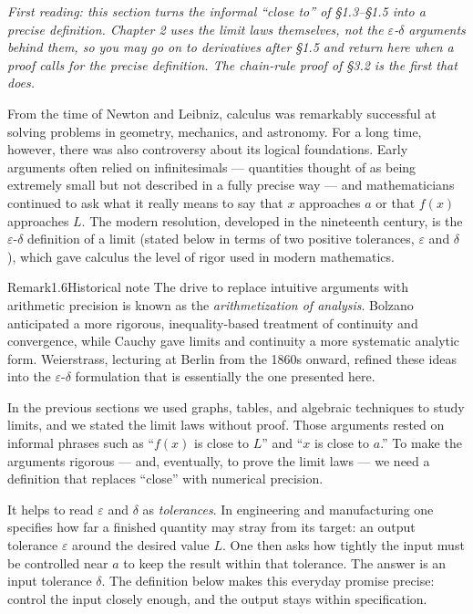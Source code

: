 \documentclass[a4paper,12pt,oneside]{memoir}
\begin{document}
\emph{First reading: this section turns the informal “close to” of §1.3–§1.5 into a precise definition. Chapter 2 uses the limit laws themselves, not the \(\varepsilon\)-\(\delta\) arguments behind them, so you may go on to derivatives after §1.5 and return here when a proof calls for the precise definition. The chain-rule proof of §3.2 is the first that does.}

From the time of Newton and Leibniz, calculus was remarkably successful at solving problems in geometry, mechanics, and astronomy. For a long time, however, there was also controversy about its logical foundations. Early arguments often relied on infinitesimals — quantities thought of as being extremely small but not described in a fully precise way — and mathematicians continued to ask what it really means to say that \(x\) approaches \(a\) or that \(f(x)\) approaches \(L\). The modern resolution, developed in the nineteenth century, is the \(\varepsilon\)-\(\delta\) definition of a limit (stated below in terms of two positive tolerances, \(\varepsilon\) and \(\delta\)), which gave calculus the level of rigor used in modern mathematics.

\begin{envremark}{Remark}{1.6}{Historical note}
The drive to replace intuitive arguments with arithmetic precision is known as the \emph{arithmetization of analysis}. Bolzano anticipated a more rigorous, inequality-based treatment of continuity and convergence, while Cauchy gave limits and continuity a more systematic analytic form. Weierstrass, lecturing at Berlin from the 1860s onward, refined these ideas into the \(\varepsilon\text{-}\delta\) formulation that is essentially the one presented here.
\end{envremark}
In the previous sections we used graphs, tables, and algebraic techniques to study limits, and we stated the limit laws without proof. Those arguments rested on informal phrases such as “\(f(x)\) is close to \(L\)” and “\(x\) is close to \(a\).” To make the arguments rigorous — and, eventually, to prove the limit laws — we need a definition that replaces “close” with numerical precision.

It helps to read \(\varepsilon\) and \(\delta\) as \emph{tolerances}. In engineering and manufacturing one specifies how far a finished quantity may stray from its target: an output tolerance \(\varepsilon\) around the desired value \(L\). One then asks how tightly the input must be controlled near \(a\) to keep the result within that tolerance. The answer is an input tolerance \(\delta\). The definition below makes this everyday promise precise: control the input closely enough, and the output stays within specification.
\end{document}
